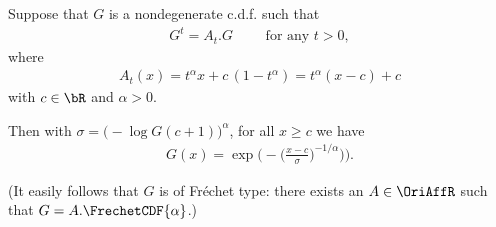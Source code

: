 \begin{lemma}
  \label{lem:characterization-self-similar-family-pos-index}
  Suppose that $G$ is a nondegenerate c.d.f. such that
  \begin{align*}
    G^{t} = A_t . G \qquad \text{ for any } t > 0 ,
  \end{align*}
  where
  \begin{align*}
    A_t(x) = t^{\alpha} x + c \, (1 - t^{\alpha}) = t^{\alpha} (x-c) + c
  \end{align*}
  with $c \in \bR$ and $\alpha > 0$.

  Then with $\sigma = \big(- \log G(c+1)\big)^{\alpha}$,
  for all $x \ge c$ we have
  \begin{align*}
    G(x) = \exp \Big( - \big( \frac{x - c}{\sigma} \big)^{-1/\alpha} \big) \Big) .
  \end{align*}

  (It easily follows that $G$ is of Fr\'echet type: there exists
  an $A \in \OriAffR$ such that $G = A.\FrechetCDF{\alpha}$.)
\end{lemma}
